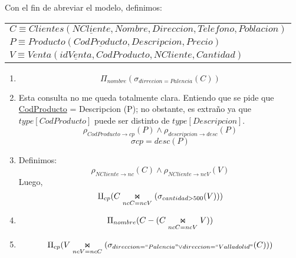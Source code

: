 Con el fin de abreviar el modelo, definimos:
\begin{center}
	\begin{tabular}{l}
		$C \equiv Clientes(\underline{NCliente}, Nombre, Direccion, Telefono, Poblacion)$\\
		$P \equiv Producto(\underline{CodProducto}, Descripcion, Precio)$\\
		$V \equiv Venta(\underline{idVenta}, CodProducto, NCliente, Cantidad)$\\
	\end{tabular}
\end{center}
\begin{enumerate}
	\item 
	$$\Pi_{nombre}(\sigma_{dirrecion = Palencia}(C))$$
	
	\item Esta consulta no me queda totalmente clara. Entiendo que se pide que \underline{CodProducto} = Descripcion (P); no obstante, es extraño ya que $type[CodProducto]$ puede ser distinto de $type[Descripcion]$.
	$$\rho_{CodProducto\rightarrow cp}(P) \land \rho_{descripcion \rightarrow desc}(P)$$
	$$\sigma{cp = desc}(P)$$
	
	\item Definimos:
	$$\rho_{NCliente \rightarrow nc} (C) \land \rho_{NCliente \rightarrow ncV} (V)$$
	Luego,
	$$\amalg _{cp}(C\innerjoin[ncC = ncV] (\sigma_{cantidad > 500} (V)))$$
	
	\item 
	$$\Pi_{nombre}(C - (C\innerjoin[ncC = ncV] V)) $$
	
	\item 
	$$\Pi_{cp}(V\innerjoin[ncV = ncC] (\sigma_{direccion = ``Palencia" \vee direccion = ``Valladolid"} (C)))$$
	
\end{enumerate}